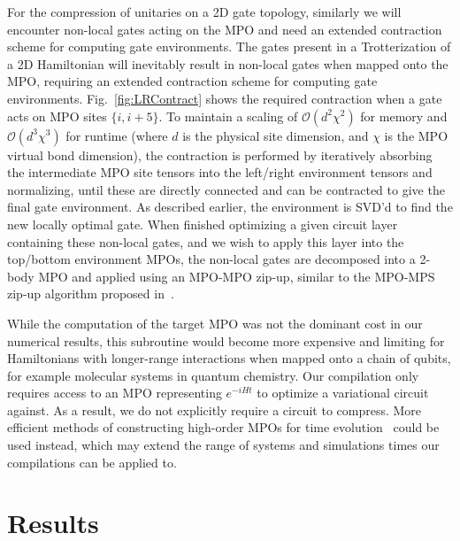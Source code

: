 \documentclass[a4paper,twocolumn,11pt,accepted=2025-06-10]{quantumarticle}
\begin{document}
For the compression of unitaries on a 2D gate topology, similarly we will encounter non-local gates acting on the MPO and need an extended contraction scheme for computing gate environments. The gates present in a Trotterization of a 2D Hamiltonian will inevitably result in non-local gates when mapped onto the MPO, requiring an extended contraction scheme for computing gate environments. Fig.~\ref{fig:LRContract} shows the required contraction when a gate acts on MPO sites $\{i, i+5\}$. To maintain a scaling of $\mathcal{O}(d^2\chi^2)$ for memory and $\mathcal{O}(d^3\chi^3)$ for runtime (where $d$ is the physical site dimension, and $\chi$ is the MPO virtual bond dimension), the contraction is performed by iteratively absorbing the intermediate MPO site tensors into the left/right environment tensors and normalizing, until these are directly connected and can be contracted to give the final gate environment. As described earlier, the environment is SVD'd to find the new locally optimal gate. When finished optimizing a given circuit layer containing these non-local gates, and we wish to apply this layer into the top/bottom environment MPOs, the non-local gates are decomposed into a 2-body MPO and applied using an MPO-MPO zip-up, similar to the MPO-MPS zip-up algorithm proposed in~\cite{stoudenmire2010minimally}.

While the computation of the target MPO was not the dominant cost in our numerical results, this subroutine would become more expensive and limiting for Hamiltonians with longer-range interactions when mapped onto a chain of qubits, for example molecular systems in quantum chemistry. Our compilation only requires access to an MPO representing $e^{-iHt}$ to optimize a variational circuit against. As a result, we do not explicitly require a circuit to compress. More efficient methods of constructing high-order MPOs for time evolution~\cite{van2024efficient,zaletel2015time} could be used instead, which may extend the range of systems and simulations times our compilations can be applied to.



\section{Results}\label{sec:results}
\end{document}
